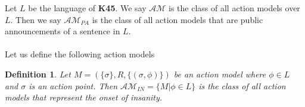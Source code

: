 \documentclass[12pt, a4paper, titlepage]{scrartcl}
\newcommand{\aRel}[1] {
  \sim_{#1} 
}
\newcommand{\actModelStates}[4] {
	(#1, \aRel{#2}, #3, #4)
}
\newtheorem{defn}{Definition}
\newtheorem{lemma}{Lemma}
\begin{document}
%
%
%
Let $L$ be the language of {\bf K45}.
We say $\mathcal{AM}$ is the class of all action models over $L$.
Then we say $\mathcal{AM}_{PA}$ is the class of all action models that
are public announcements of a sentence in $L$.\\
\\
Let us define the following action models
\begin{defn} \label{insanity}
Let $M = (\{ \sigma \}, R, \{(\sigma, \phi)\}) $ be an action model
where $\phi \in L$ and $\sigma$ is an action point.
Then $\mathcal{AM}_{IN} = \{M | \phi \in L\}$ is the class of all action models
that represent the onset of insanity.
\end{defn}
\end{document}
